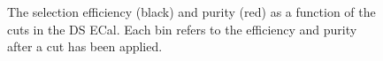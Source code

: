 \begin{figure}
\begin{minipage}{.5\linewidth}
\centering
{}
\end{minipage}\par\medskip
\caption{The selection efficiency (black) and purity (red) as a function of the cuts in the DS ECal.  Each bin refers to the efficiency and purity after a cut has been applied.}
\label{fig:SelEffPurCutLevelDS}
\end{figure}
